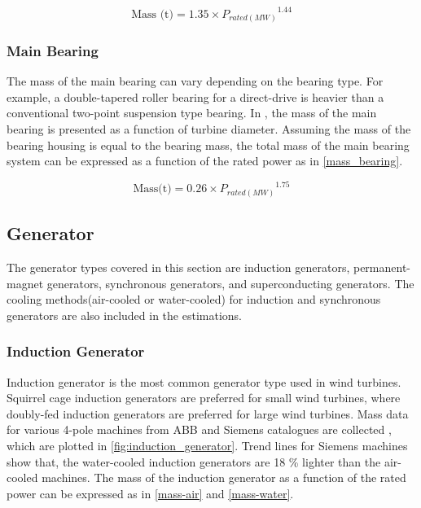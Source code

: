 \documentclass{article}\usepackage{graphicx, color}
\begin{document}
\begin{equation}
		\text{Mass (t)} = 1.35 \times {P_{rated(MW)}}^{1.44}
\end{equation}

\subsubsection{Main Bearing}

The mass of the main bearing can vary depending on the bearing type. For example, a double-tapered roller bearing for a direct-drive is heavier than a conventional two-point suspension type bearing. In  \cite{Fingersh2006}, the mass of the main bearing is presented as a function of turbine diameter. Assuming the mass of the bearing housing is equal to the bearing mass, the total mass of the main bearing system can be expressed as a function of the rated power as in \autoref{mass_bearing}.

\begin{equation}
	\text{Mass(t)} = 0.26 \times {P_{rated(MW)}}^{1.75}
  \label{mass_bearing}
\end{equation}

\subsection{Generator}

The generator types covered in this section are induction generators, permanent-magnet generators, synchronous generators, and superconducting generators. The cooling methods(air-cooled or water-cooled) for induction and synchronous generators are also included in the estimations. 

\subsubsection{Induction Generator}

Induction generator is the most common generator type used in wind turbines. Squirrel cage induction generators are preferred for small wind turbines, where doubly-fed induction generators are preferred for large wind turbines. Mass data for various 4-pole machines from ABB and Siemens catalogues are collected \cite{ABB2012a, Siemens}, which are plotted in \autoref{fig:induction_generator}. Trend lines for Siemens machines show that, the water-cooled induction generators are 18 \% lighter than the air-cooled machines. The mass of the induction generator as a function of the rated power can be expressed as in \autoref{mass-air} and \autoref{mass-water}.
\end{document}

